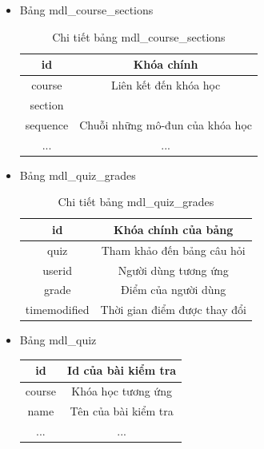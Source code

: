\begin{itemize}
\begin{center}
	\end{center}
	\item Bảng mdl\_course\_sections
	\begin{center}
		\begin{table}[!htp]
			\centering
			\begin{tabular}{|c|c|}
				\hline 
				id & Khóa chính \\ 
				\hline 
				course & Liên kết đến khóa học \\ 
				\hline 
				section &  \\ 
				\hline 
				sequence & Chuỗi những mô-đun của khóa học \\ 
				\hline 
				... & ... \\ 
				\hline 
			\end{tabular} 
			\caption{Chi tiết bảng mdl\_course\_sections}
			\label{bang9}
		\end{table}
	\end{center}
	\item Bảng mdl\_quiz\_grades
	\begin{center}
		\begin{table}[!htp]
			\centering
			\begin{tabular}{|c|c|}
				\hline 
				id & Khóa chính của bảng \\ 
				\hline 
				quiz & Tham khảo đến bảng câu hỏi \\ 
				\hline 
				userid & Người dùng tương ứng \\ 
				\hline 
				grade & Điểm của người dùng \\ 
				\hline 
				timemodified & Thời gian điểm được thay đổi \\ 
				\hline 
			\end{tabular} 
			\caption{Chi tiết bảng mdl\_quiz\_grades}
			\label{bang10}
		\end{table}
	\end{center}
	\item Bảng mdl\_quiz
	\begin{center}
		\begin{table}[!htp]
			\centering
			\begin{tabular}{|c|c|}
				\hline 
				id & Id của bài kiểm tra \\ 
				\hline 
				course & Khóa học tương ứng \\ 
				\hline 
				name & Tên của bài kiểm tra \\ 
				\hline 
				... & ... \\ 
				\hline 
			\end{tabular} 

\end{table}
\end{center}
\end{itemize}
